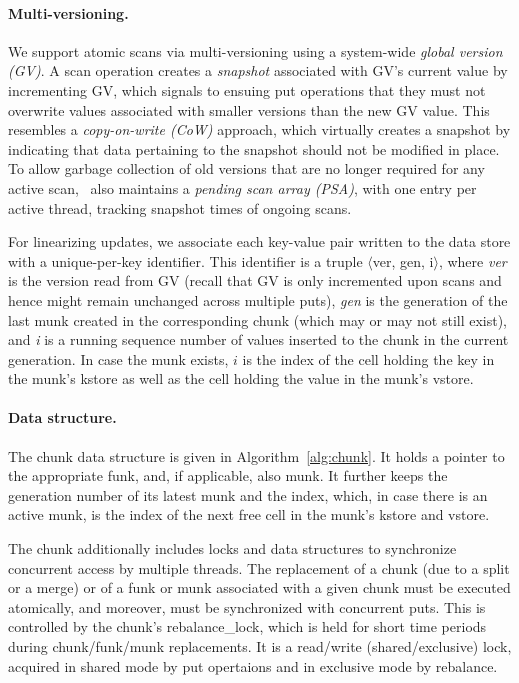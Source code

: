 \paragraph{Multi-versioning.}

We support atomic scans via multi-versioning using a system-wide \emph{global version (GV)}. 
A scan operation creates a \emph{snapshot} associated with GV's current value by incrementing GV, 
which signals to ensuing put operations that they must not overwrite values associated with 
smaller versions than the new GV value.
This resembles a \emph{copy-on-write (CoW)} approach, which virtually creates a snapshot by 
indicating that data pertaining to the snapshot should not be modified in place.  
To allow garbage collection of old versions that are no longer required for any active scan, \sys\ also maintains 
a \emph{pending scan array (PSA)}, with one entry per active thread, tracking snapshot times of ongoing scans.

For linearizing updates, we associate each key-value pair written to the data store with a unique-per-key identifier.
This identifier is a truple $\langle$ver, gen, i$\rangle$, where \emph{ver} is  the version read from GV 
(recall that GV is only incremented upon scans and hence might remain unchanged across multiple puts),
\emph{gen} is the generation of the last munk created in the corresponding chunk
(which may or may not still exist), 
and \emph{i} is a running sequence number of values inserted to the chunk in the current generation.
In case the munk exists, $i$ is the 
index of the cell holding the key in the munk's kstore as well as the cell holding the value in the munk's vstore. 

\paragraph{Data structure.}

The chunk data structure is given in Algorithm~\ref{alg:chunk}. 
It holds a pointer to the appropriate funk, and, if applicable, also munk. 
It further keeps the generation number of its latest munk and the index,
which, in case there is an active munk, is the index of the next free cell in the munk's kstore and vstore.

The chunk additionally includes locks and data structures to synchronize concurrent access by multiple threads.
The replacement of a chunk (due to a split or a merge) or of a funk or munk associated with a given chunk 
must be executed atomically, and moreover, must be synchronized with concurrent puts. 
This is controlled by the chunk's rebalance\_lock, which is held for short time periods
during chunk/funk/munk replacements.  It is a read/write (shared/exclusive) lock, acquired in shared mode 
by put opertaions and in exclusive mode by rebalance. 

